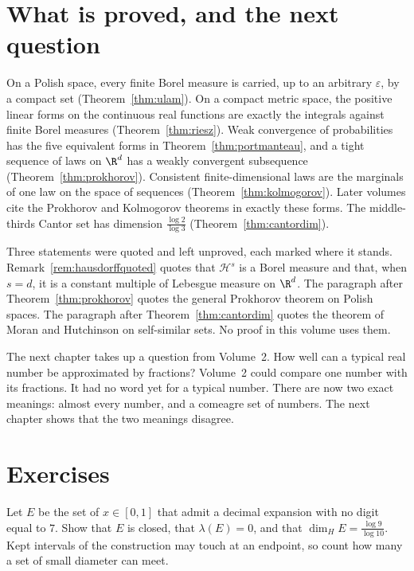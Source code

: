 \section{What is proved, and the next question}

On a Polish space, every finite Borel measure is carried, up to an arbitrary $\varepsilon$, by a compact set (Theorem~\ref{thm:ulam}). On a compact
metric space, the positive linear forms on the continuous real functions are exactly the integrals against finite Borel measures
(Theorem~\ref{thm:riesz}). Weak convergence of probabilities has the five equivalent forms in Theorem~\ref{thm:portmanteau}, and a tight
sequence of laws on $\R^d$ has a weakly convergent subsequence (Theorem~\ref{thm:prokhorov}). Consistent finite-dimensional laws are the
marginals of one law on the space of sequences (Theorem~\ref{thm:kolmogorov}). Later volumes cite the Prokhorov and Kolmogorov theorems in
exactly these forms. The middle-thirds Cantor set has dimension $\frac{\log 2}{\log 3}$ (Theorem~\ref{thm:cantordim}).

Three statements were quoted and left unproved, each marked where it stands. Remark~\ref{rem:hausdorffquoted} quotes that $\mathcal H^s$ is a
Borel measure and that, when $s=d$, it is a constant multiple of Lebesgue measure on $\R^d$. The paragraph after Theorem~\ref{thm:prokhorov}
quotes the general Prokhorov theorem on Polish spaces. The paragraph after Theorem~\ref{thm:cantordim} quotes the theorem of Moran and
Hutchinson on self-similar sets. No proof in this volume uses them.

The next chapter takes up a question from Volume~2. How well can a typical real number be approximated by fractions? Volume~2 could compare
one number with its fractions. It had no word yet for a typical number. There are now two exact meanings: almost every number, and a comeagre
set of numbers. The next chapter shows that the two meanings disagree.

\section{Exercises}

\begin{exercise}[$\star$]\label{ex:nodigit7}
Let $E$ be the set of $x\in[0,1]$ that admit a decimal expansion with no digit equal to $7$. Show that $E$ is closed, that $\lambda(E)=0$, and
that $\dim_H E=\frac{\log 9}{\log 10}$. Kept intervals of the construction may touch at an endpoint, so count how many a set of small diameter
can meet.
\end{exercise}

